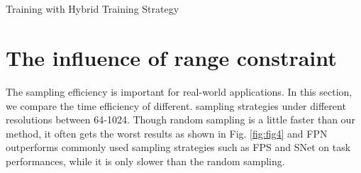 \documentclass[review]{article}
\begin{document}
\section*{}

\begin{algorithm}
\caption{Training with Hybrid Training Strategy}
\label{alg:cap}
\begin{algorithmic}
 
    \EndFor



\end{algorithmic}
\end{algorithm}

\section{The influence of range constraint}
The sampling efficiency is important for real-world applications. In this section, we compare the time efficiency of different.
sampling strategies under different resolutions between 64-1024.
Though random sampling is a little faster than our method, it often gets the worst results as shown in Fig. \ref{fig:fig4} and FPN outperforms commonly used sampling strategies such as FPS and SNet on task performances, while \cite{qi2019deep} it is only slower than the random
sampling. 
\end{document}
